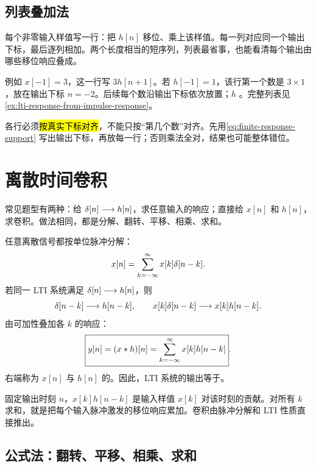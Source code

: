 \subsection{列表叠加法}

每个非零输入样值写一行：把 $h[n]$ 移位、乘上该样值。每一列对应同一个输出下标，最后逐列相加。两个长度相当的短序列，列表最省事，也能看清每个输出由哪些移位响应叠成。

例如 $x[-1]=3$，这一行写 $3h[n+1]$。若 $h[-1]=1$，该行第一个数是 $3\times1$，放在输出下标 $n=-2$。后续每个数沿输出下标依次放置；$h$ 。完整列表见\cref{ex:lti-response-from-impulse-response}。

\begin{pitfall}[只按表格位置相加]
  各行必须\hl{按真实下标对齐}，不能只按“第几个数”对齐。先用\cref{eq:finite-response-support} 写出输出下标，再放每一行；否则乘法全对，结果也可能整体错位。
\end{pitfall}

\section{离散时间卷积}
\label{sec:discrete-convolution}

常见题型有两种：给 $\delta[n]\longrightarrow h[n]$，求任意输入的响应；直接给 $x[n]$ 和 $h[n]$，求卷积。做法相同，都是分解、翻转、平移、相乘、求和。

任意离散信号都按单位脉冲分解：
\[
  x[n]=\sum_{k=-\infty}^{\infty}x[k]\delta[n-k].
\]
若同一 LTI 系统满足 $\delta[n]\longrightarrow h[n]$，则
\[
  \delta[n-k]\longrightarrow h[n-k],
  \qquad
  x[k]\delta[n-k]\longrightarrow x[k]h[n-k].
\]
由可加性叠加各 $k$ 的响应：
\begin{equation}
  \boxed{
    y[n]=(x\mathbin{\ast} h)[n]
    =\sum_{k=-\infty}^{\infty}x[k]h[n-k]
  }.
  \label{eq:discrete-convolution-sum}
\end{equation}
右端称为 $x[n]$ 与 $h[n]$ 的。因此，LTI 系统的输出等于。

\begin{intuition}
  固定输出时刻 $n$，$x[k]h[n-k]$ 是输入样值 $x[k]$ 对该时刻的贡献。对所有 $k$ 求和，就是把每个输入脉冲激发的移位响应累加。卷积由脉冲分解和 LTI 性质直接推出。
\end{intuition}

\subsection{公式法：翻转、平移、相乘、求和}


